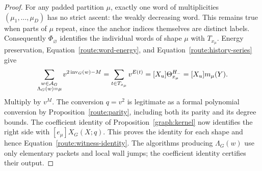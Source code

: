 \begin{proof}
For any padded partition $\mu$, exactly one word of multiplicities
$(\mu_1,\ldots,\mu_D)$ has no strict ascent: the weakly decreasing
word.  This remains true when parts of $\mu$ repeat, since the
anchor indices themselves are distinct labels.  Consequently
$\Phi_{\varnothing}$ identifies the individual words of shape
$\mu$ with $T_{x_\mu}$.  Energy preservation,
Equation~\eqref{route:word-energy}, and Equation~\eqref{route:history-series} give
\[
 \sum_{\substack{w\in\mathcal A_G\\\Lambda_G(w)=\mu}}
       v^{2\operatorname{inv}_G(w)-M}
   =\sum_{t\in T_{x_\mu}}v^{E(t)}
   =[X_u]\Theta_{x_\mu}^{H_-}
   =[X_u]m_\mu(Y).
\]
Multiply by $v^M$.  The conversion $q=v^2$ is legitimate as a
formal polynomial conversion by
Proposition~\ref{route:parity}, including both its parity and its
degree bounds.  The coefficient identity of
Proposition~\ref{graph:kernel} now identifies the right side with
$[e_\mu]X_G(X;q)$.  This proves the identity for each shape and
hence Equation~\eqref{route:witness-identity}. The algorithms producing
$\Lambda_G(w)$ use only elementary packets and local wall jumps;
the coefficient identity certifies their output.
\end{proof}
